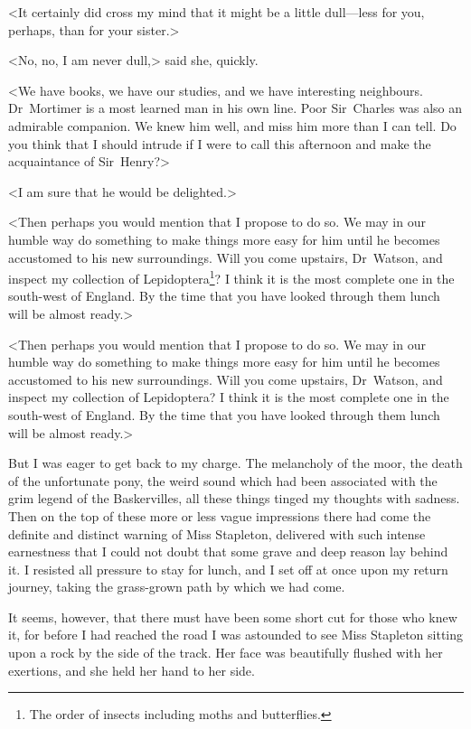 <It certainly did cross my mind that it might be a little dull—less for you, perhaps, than for your sister.>

<No, no, I am never dull,> said she, quickly.

<We have books, we have our studies, and we have interesting neighbours. Dr~Mortimer is a most learned man in his own line. Poor Sir~Charles was also an admirable companion. We knew him well, and miss him more than I can tell. Do you think that I should intrude if I were to call this afternoon and make the acquaintance of Sir~Henry?>

<I am sure that he would be delighted.>

\begin{withfootnotes}
<Then perhaps you would mention that I propose to do so. We may in our humble way do something to make things more easy for him until he becomes accustomed to his new surroundings. Will you come upstairs, Dr~Watson, and inspect my collection of Lepidoptera\footnote{The order of insects including moths and butterflies.}? I think it is the most complete one in the south-west of England. By the time that you have looked through them lunch will be almost ready.>
\end{withfootnotes}

\begin{withoutfootnotes}
<Then perhaps you would mention that I propose to do so. We may in our humble way do something to make things more easy for him until he becomes accustomed to his new surroundings. Will you come upstairs, Dr~Watson, and inspect my collection of Lepidoptera? I think it is the most complete one in the south-west of England. By the time that you have looked through them lunch will be almost ready.>
\end{withoutfootnotes}

But I was eager to get back to my charge. The melancholy of the moor, the death of the unfortunate pony, the weird sound which had been associated with the grim legend of the Baskervilles, all these things tinged my thoughts with sadness. Then on the top of these more or less vague impressions there had come the definite and distinct warning of Miss Stapleton, delivered with such intense earnestness that I could not doubt that some grave and deep reason lay behind it. I resisted all pressure to stay for lunch, and I set off at once upon my return journey, taking the grass-grown path by which we had come.

It seems, however, that there must have been some short cut for those who knew it, for before I had reached the road I was astounded to see Miss Stapleton sitting upon a rock by the side of the track. Her face was beautifully flushed with her exertions, and she held her hand to her side.

